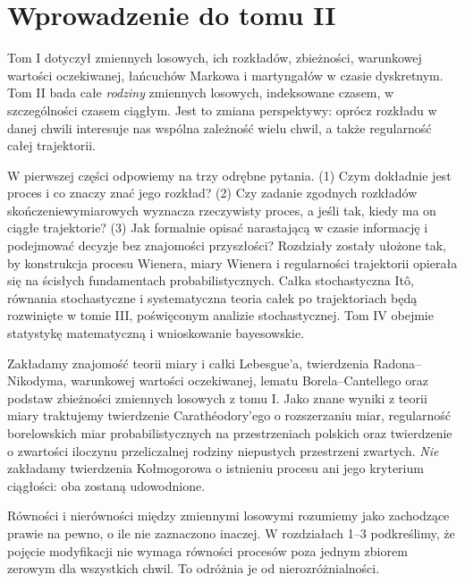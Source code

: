 \chapter*{Wprowadzenie do tomu II}
Tom I dotyczył zmiennych losowych, ich rozkładów, zbieżności, warunkowej
wartości oczekiwanej, łańcuchów Markowa i martyngałów w czasie dyskretnym.
Tom II bada całe \emph{rodziny} zmiennych losowych, indeksowane czasem,
w szczególności czasem ciągłym. Jest to zmiana perspektywy: oprócz rozkładu
w danej chwili interesuje nas wspólna zależność wielu chwil, a także
regularność całej trajektorii.

W pierwszej części odpowiemy na trzy odrębne pytania. (1) Czym dokładnie
jest proces i co znaczy znać jego rozkład? (2) Czy zadanie zgodnych
rozkładów skończeniewymiarowych wyznacza rzeczywisty proces, a jeśli tak,
kiedy ma on ciągłe trajektorie? (3) Jak formalnie opisać narastającą
w czasie informację i podejmować decyzje bez znajomości przyszłości?
Rozdziały zostały ułożone tak, by konstrukcja procesu Wienera,
miary Wienera i regularności trajektorii opierała się na ścisłych
fundamentach probabilistycznych. Całka stochastyczna Itô,
równania stochastyczne i systematyczna teoria całek po trajektoriach
będą rozwinięte w tomie III, poświęconym analizie stochastycznej.
Tom IV obejmie statystykę matematyczną i wnioskowanie bayesowskie.

Zakładamy znajomość teorii miary i całki Lebesgue'a, twierdzenia
Radona--Nikodyma, warunkowej wartości oczekiwanej, lematu
Borela--Cantellego oraz podstaw zbieżności zmiennych losowych z tomu I.
Jako znane wyniki z teorii miary traktujemy twierdzenie Carathéodory'ego
o rozszerzaniu miar, regularność borelowskich miar probabilistycznych
na przestrzeniach polskich oraz twierdzenie o zwartości iloczynu
przeliczalnej rodziny niepustych przestrzeni zwartych.
\emph{Nie} zakładamy twierdzenia Kołmogorowa o istnieniu procesu ani jego
kryterium ciągłości: oba zostaną udowodnione.

Równości i nierówności między zmiennymi losowymi rozumiemy
jako zachodzące prawie na pewno, o ile nie zaznaczono inaczej.
W rozdziałach 1--3 podkreślimy, że pojęcie modyfikacji nie wymaga
równości procesów poza jednym zbiorem zerowym dla wszystkich chwil.
To odróżnia je od nierozróżnialności.

